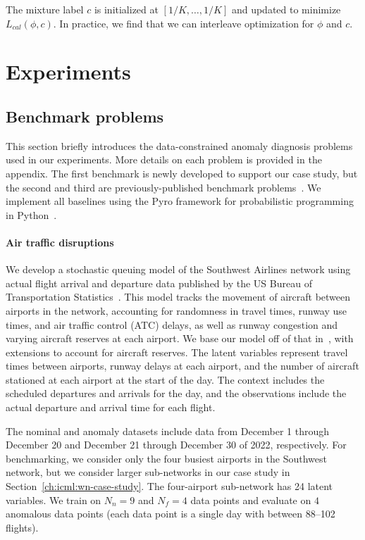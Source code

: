 The mixture label $c$ is initialized at $[1/K, \ldots, 1/K]$ and updated to minimize $L_{cal}(\phi, c)$. In practice, we find that we can interleave optimization for $\phi$ and $c$.

\section{Experiments}\label{ch:icml:experiments}

\subsection{Benchmark problems}\label{ch:icml:examples}

This section briefly introduces the data-constrained anomaly diagnosis problems used in our experiments. More details on each problem is provided in the appendix. The first benchmark is newly developed to support our case study, but the second and third are previously-published benchmark problems~\cite{keipourALFADatasetUAV2021,dengOpenFWILargescaleMultistructural2022}. We implement all baselines using the Pyro framework for probabilistic programming in Python~\cite{binghamPyroDeepUniversal2019}.

\paragraph{Air traffic disruptions} We develop a stochastic queuing model of the Southwest Airlines network using actual flight arrival and departure data published by the US Bureau of Transportation Statistics~\cite{bureauoftransportationstatisticsTranStatsDepartmentTransportation}. This model tracks the movement of aircraft between airports in the network, accounting for randomness in travel times, runway use times, and air traffic control (ATC) delays, as well as runway congestion and varying aircraft reserves at each airport. We base our model off of that in~\cite{pyrgiotisModellingDelayPropagation2013}, with extensions to account for aircraft reserves. The latent variables represent travel times between airports, runway delays at each airport, and the number of aircraft stationed at each airport at the start of the day. The context includes the scheduled departures and arrivals for the day, and the observations include the actual departure and arrival time for each flight.

The nominal and anomaly datasets include data from December 1 through December 20 and December 21 through December 30 of 2022, respectively. For benchmarking, we consider only the four busiest airports in the Southwest network, but we consider larger sub-networks in our case study in Section~\ref{ch:icml:wn-case-study}. The four-airport sub-network has 24 latent variables. We train on $N_n = 9$ and $N_f = 4$ data points and evaluate on $4$ anomalous data points (each data point is a single day with between 88--102 flights).

